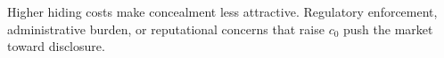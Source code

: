 Higher hiding costs make concealment less attractive. Regulatory enforcement, administrative burden, or reputational concerns that raise $c_0$ push the market toward disclosure.
